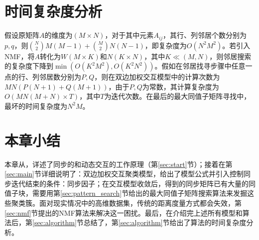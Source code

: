 \vspace{-2mm}
\section{时间复杂度分析}
\label{time_complex}
\vspace{-2mm}
假设原矩阵$A$的维度为$(M\times{}N)$，对于其中元素$A_{ij}$，其行、列邻居个数分别为$p,q$，则${N\choose2}M(M-1)+{M\choose2}N(N-1)$，即复杂度为$O(N^2 M^2)$。若引入NMF，将$A$转化为$W(M\times{}K)$和$N(K\times{}N)$，其中$K\ll{}(M,N)$，则邻居搜索的复杂度下降到$\min\left(O\left(K^2M^2\right),O\left(K^2N^2\right)\right)$。假如在邻居找寻步骤中任意一点的行、列邻居数分别为$P,Q$，则在双边加权交互模型中的计算次数为$MN(P(N+1)+Q(M+1))$，由于$P,Q$为常数，其计算复杂度为$O(MN(M+N)\times{}T)$，其中$T$为迭代次数。在最后的最大同值子矩阵寻找中，最坏的时间复杂度为$N^2M$。

\vspace{-2mm}
\section{本章小结}
\vspace{-2mm}
本章从，详述了同步的和动态交互的工作原理（第\ref{sec:start}节）；接着在第\ref{sec:main}节详细说明了：双边加权交互聚类模型，给出了模型公式并引入控制同步迭代结束的条件：同步因子；在交互模型收敛后，得到的同步矩阵已有大量的同值子块，需要用第\ref{sec:pattern_search}节给出的最大同值子矩阵搜索算法来发掘这些聚类簇。面对现实情况中的高维数据集，传统的距离度量方式都会失效，第\ref{sec:nmf}节提出的NMF算法来解决这一困扰。最后，在介绍完上述所有模型和算法后，第\ref{sec:algorithm}节总结了，第\ref{sec:algorithm}节给出了算法的时间复杂度分析。

\newpage\mbox{}\thispagestyle{empty}\newpage
